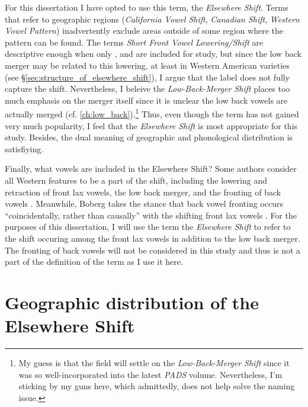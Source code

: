 For this dissertation I have opted to use this term, the \textit{Elsewhere Shift}. Terms that refer to geographic regions (\textit{California Vowel Shift}, \textit{Canadian Shift}, \textit{Western Vowel Pattern}) inadvertently exclude areas outside of some region where the pattern can be found. The terms \textit{Short Front Vowel Lowering/Shift} are descriptive enough when only \kit, \dress and \trap are included for study, but since the low back merger may be related to this lowering, at least in Western American varieties (see \S\ref{sec:structure_of_elsewhere_shift}), I argue that the label does not fully capture the shift. Nevertheless, I beleive the \textit{Low-Back-Merger Shift} places too much emphasis on the merger itself since it is unclear the low back vowels are actually merged (cf. \ref{ch:low_back}).\footnote{My guess is that the field will settle on the \textit{Low-Back-Merger Shift} since it was so well-incorporated into the latest \textit{PADS} volume. Nevertheless, I'm sticking by my guns here, which admittedly, does not help solve the naming issue.} Thus, even though the term has not gained very much popularity, I feel that the \textit{Elsewhere Shift} is most appropriate for this study. Besides, the dual meaning of geographic and phonological distribution is satisfiying.



Finally, what vowels are included in the Elsewhere Shift? Some authors consider all Western features to be a part of the shift, including the lowering and retraction of front lax vowels, the low back merger, and the fronting of back vowels \citep{eckert_2004, eckert_2011, podesva_2011, podesva_etal_2015, donofrio_etal_2017_pads, donofrio_etal_2019}. Meanwhile, Boberg takes the stance that back vowel fronting occurs ``coincidentally, rather than causally'' with the shifting front lax vowels \citet[12]{boberg_2019}. For the purposes of this dissertation, I will use the term the \textit{Elsewhere Shift} to refer to the shift occuring among the front lax vowels in addition to the low back merger. The fronting of back vowels will not be considered in this study and thus is not a part of the definition of the term as I use it here.




\section{Geographic distribution of the Elsewhere Shift}
\label{sec:geography_of_elsewhere_shift}

